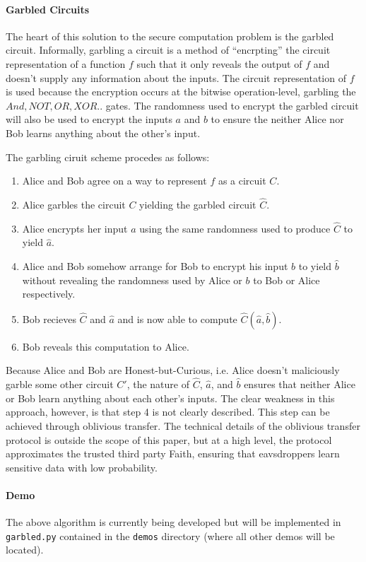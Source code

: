 \paragraph{Garbled Circuits}
The heart of this solution to the secure computation problem is the garbled circuit. Informally, garbling a circuit is a method of ``encrpting'' the circuit representation of a function $f$ such that it only reveals the output of $f$ and doesn't supply any information about the inputs. The circuit representation of $f$ is used because the encryption occurs at the bitwise operation-level, garbling the $And, NOT, OR, XOR..$ gates. The randomness used to encrypt the garbled circuit will also be used to encrypt the inputs $a$ and $b$ to ensure the neither Alice nor Bob learns anything about the other's input.

The garbling ciruit scheme procedes as follows:
\begin{enumerate}
\item Alice and Bob agree on a way to represent $f$ as a circuit $C$.
\item Alice garbles the circuit $C$ yielding the garbled circuit $\hat{C}$.
\item Alice encrypts her input $a$ using the same randomness used to produce $\hat{C}$ to yield $\hat{a}$.
\item Alice and Bob somehow arrange for Bob to encrypt his input $b$ to yield $\hat{b}$ without revealing the randomness used by Alice or $b$ to Bob or Alice respectively.
\item Bob recieves $\hat{C}$ and $\hat{a}$ and is now able to compute $\hat{C}(\hat{a}, \hat{b})$.
\item Bob reveals this computation to Alice.
\end{enumerate}
Because Alice and Bob are Honest-but-Curious, i.e. Alice doesn't maliciously garble some other circuit $C'$, the nature of $\hat{C}$, $\hat{a}$, and $\hat{b}$ ensures that neither Alice or Bob learn anything about each other's inputs. The clear weakness in this approach, however, is that step 4 is not clearly described. This step can be achieved through oblivious transfer. The technical details of the oblivious transfer protocol is outside the scope of this paper, but at a high level, the protocol approximates the trusted third party Faith, ensuring that eavsdroppers learn sensitive data with low probability.

\paragraph{Demo}
The above algorithm is currently being developed but will be implemented in \texttt{garbled.py} contained in the \texttt{demos} directory (where all other demos will be located).

